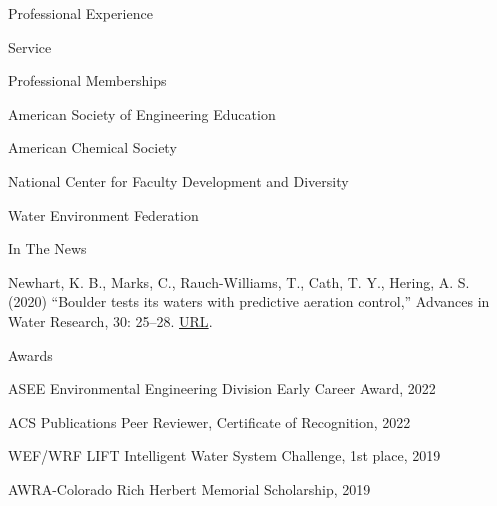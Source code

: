 \documentclass{resume} %
\begin{document}
\begin{rSection}{Professional Experience}
\begin{rSection}{Service}
\end{rSection}

\begin{rSection}{Professional Memberships}

American Society of Engineering Education

American Chemical Society

National Center for Faculty Development and Diversity

Water Environment Federation

\end{rSection}



\begin{rSection}{In The News}

Newhart, K. B., Marks, C., Rauch-Williams, T., Cath, T. Y., Hering, A. S. (2020) “Boulder tests its waters with predictive aeration control,” Advances in Water Research, 30: 25–28. \href{https://www.advancesinwaterresearch.org/awr/20200709/MobilePagedArticle.action?articleId=1621836&pm=1#articleId1621836}{URL}.
\end{rSection}



\begin{rSection}{Awards}

ASEE Environmental Engineering Division Early Career Award, 2022

ACS Publications Peer Reviewer, Certificate of Recognition, 2022

WEF/WRF LIFT Intelligent Water System Challenge, 1st place, 2019

AWRA-Colorado Rich Herbert Memorial Scholarship, 2019

\end{rSection}



\end{rSection}
\end{document}
